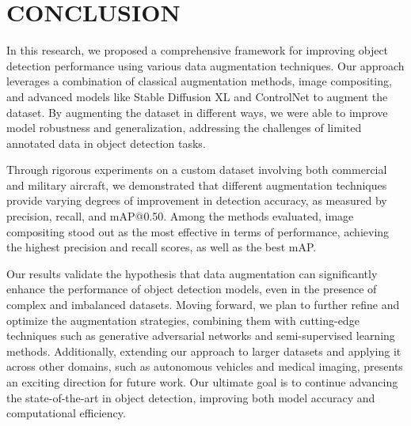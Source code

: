 \section{\uppercase{conclusion}}
\label{sec:conclusion}
In this research, we proposed a comprehensive framework for improving object detection performance using various data augmentation techniques. Our approach leverages a combination of classical augmentation methods, image compositing, and advanced models like Stable Diffusion XL and ControlNet to augment the dataset. By augmenting the dataset in different ways, we were able to improve model robustness and generalization, addressing the challenges of limited annotated data in object detection tasks. 

Through rigorous experiments on a custom dataset involving both commercial and military aircraft, we demonstrated that different augmentation techniques provide varying degrees of improvement in detection accuracy, as measured by precision, recall, and mAP@0.50. Among the methods evaluated, image compositing stood out as the most effective in terms of performance, achieving the highest precision and recall scores, as well as the best mAP. 

Our results validate the hypothesis that data augmentation can significantly enhance the performance of object detection models, even in the presence of complex and imbalanced datasets. Moving forward, we plan to further refine and optimize the augmentation strategies, combining them with cutting-edge techniques such as generative adversarial networks and semi-supervised learning methods. Additionally, extending our approach to larger datasets and applying it across other domains, such as autonomous vehicles and medical imaging, presents an exciting direction for future work. Our ultimate goal is to continue advancing the state-of-the-art in object detection, improving both model accuracy and computational efficiency.
